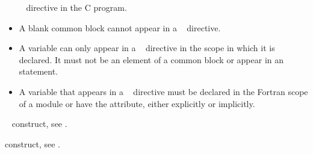 \begin{fortranspecific}
\begin{itemize}
      ~ directive in the C program.
\item A blank common block cannot appear in a ~
      directive.
\item A variable can only appear in a ~ directive
      in the scope in which it is declared. It must not be an element of a
      common block or appear in an  statement.
\item A variable that appears in a ~ directive
      must be declared in the Fortran scope of a module or have the
       attribute, either explicitly or implicitly.
\end{itemize}
\end{fortranspecific}

\begin{crossrefs}
\item {}~ construct, see
.

\item {} construct, see
.
\end{crossrefs}
